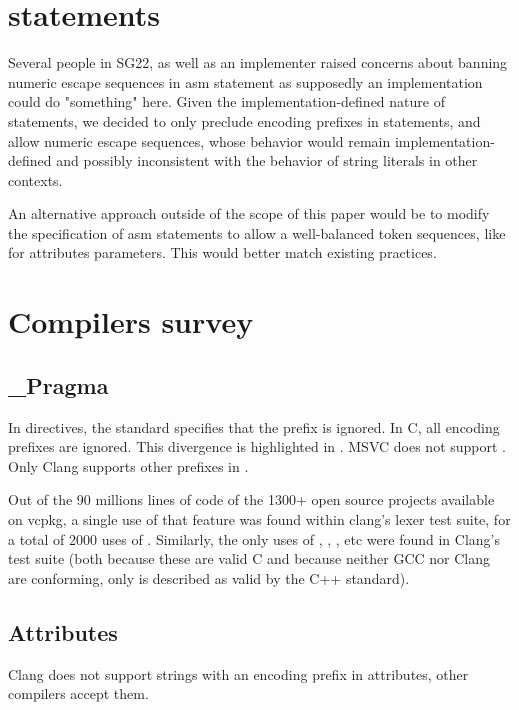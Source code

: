 \documentclass{wg21}
\begin{document}
\section{ statements}

Several people in SG22, as well as an implementer raised concerns about banning numeric escape sequences
in asm statement as supposedly an implementation could do "something" here.
Given the implementation-defined nature of  statements, we decided to only preclude encoding prefixes in  statements,
and allow numeric escape sequences, whose behavior would remain implementation-defined and possibly inconsistent with the behavior of string literals
in other contexts.

An alternative approach outside of the scope of this paper would be to modify the specification of asm statements to allow a well-balanced token sequences,
like for attributes parameters. This would better match existing practices.

\section{Compilers survey}

\subsection{_Pragma}

In  directives, the standard specifies that the  prefix is ignored.
In C, all encoding prefixes are ignored. This divergence is highlighted in .
MSVC does not support .  Only Clang supports other prefixes in .

Out of the 90 millions lines of code of the 1300+ open source projects available on vcpkg, a
single use of that feature was found within clang’s lexer test suite, for a total of 2000 uses
of . Similarly, the only uses of , , , etc were
found in Clang’s test suite (both because these are valid C and because neither GCC nor Clang
are conforming, only  is described as valid by the C++ standard).

\subsection{Attributes}

Clang does not support strings with an encoding prefix in attributes, other compilers accept them.
\end{document}
